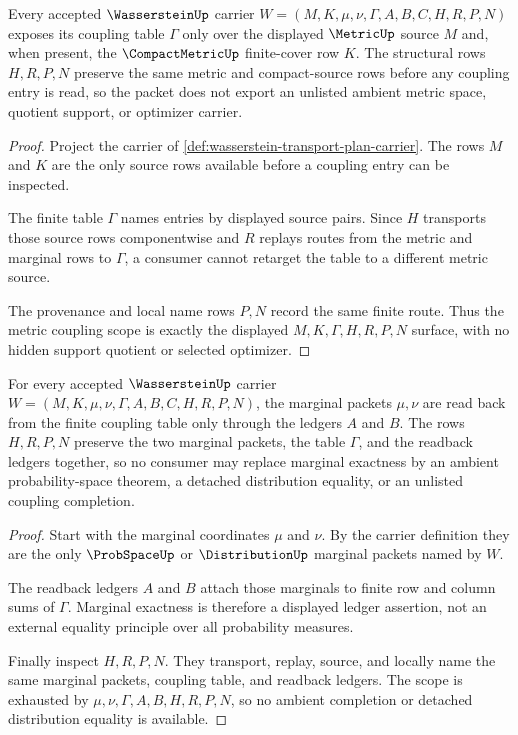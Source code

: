 \begin{theorem}
\label{thm:wasserstein-metric-coupling-scope}
Every accepted $\WassersteinUp$ carrier $W=(M,K,\mu,\nu,\Gamma,A,B,C,H,R,P,N)$ exposes its coupling table $\Gamma$ only over the displayed $\MetricUp$ source $M$ and, when present, the $\CompactMetricUp$ finite-cover row $K$. The structural rows $H,R,P,N$ preserve the same metric and compact-source rows before any coupling entry is read, so the packet does not export an unlisted ambient metric space, quotient support, or optimizer carrier.
\end{theorem}
\begin{proof}
Project the carrier of \autoref{def:wasserstein-transport-plan-carrier}. The rows $M$ and $K$ are the only source rows available before a coupling entry can be inspected.

The finite table $\Gamma$ names entries by displayed source pairs. Since $H$ transports those source rows componentwise and $R$ replays routes from the metric and marginal rows to $\Gamma$, a consumer cannot retarget the table to a different metric source.

The provenance and local name rows $P,N$ record the same finite route. Thus the metric coupling scope is exactly the displayed $M,K,\Gamma,H,R,P,N$ surface, with no hidden support quotient or selected optimizer.
\end{proof}

\begin{theorem}
\label{thm:wasserstein-marginal-exactness-scope}
For every accepted $\WassersteinUp$ carrier $W=(M,K,\mu,\nu,\Gamma,A,B,C,H,R,P,N)$, the marginal packets $\mu,\nu$ are read back from the finite coupling table only through the ledgers $A$ and $B$. The rows $H,R,P,N$ preserve the two marginal packets, the table $\Gamma$, and the readback ledgers together, so no consumer may replace marginal exactness by an ambient probability-space theorem, a detached distribution equality, or an unlisted coupling completion.
\end{theorem}
\begin{proof}
Start with the marginal coordinates $\mu$ and $\nu$. By the carrier definition they are the only $\ProbSpaceUp$ or $\DistributionUp$ marginal packets named by $W$.

The readback ledgers $A$ and $B$ attach those marginals to finite row and column sums of $\Gamma$. Marginal exactness is therefore a displayed ledger assertion, not an external equality principle over all probability measures.

Finally inspect $H,R,P,N$. They transport, replay, source, and locally name the same marginal packets, coupling table, and readback ledgers. The scope is exhausted by $\mu,\nu,\Gamma,A,B,H,R,P,N$, so no ambient completion or detached distribution equality is available.
\end{proof}

